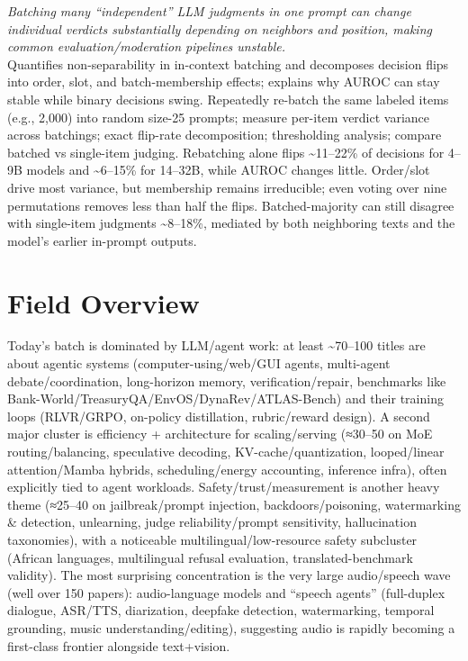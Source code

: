 \documentclass[12pt,letterpaper]{article}
\begin{document}
{\small\textit{Batching many ``independent'' LLM judgments in one prompt can change individual verdicts substantially depending on neighbors and position, making common evaluation/moderation pipelines unstable.}}\\[1pt]
{\footnotesize Quantifies non-separability in in-context batching and decomposes decision flips into order, slot, and batch-membership effects; explains why AUROC can stay stable while binary decisions swing. Repeatedly re-batch the same labeled items (e.g., 2,000) into random size-25 prompts; measure per-item verdict variance across batchings; exact flip-rate decomposition; thresholding analysis; compare batched vs single-item judging. Rebatching alone flips \textasciitilde{}11--22\% of decisions for 4--9B models and \textasciitilde{}6--15\% for 14--32B, while AUROC changes little. Order/slot drive most variance, but membership remains irreducible; even voting over nine permutations removes less than half the flips. Batched-majority can still disagree with single-item judgments \textasciitilde{}8--18\%, mediated by both neighboring texts and the model's earlier in-prompt outputs.}

\medskip



\section*{Field Overview}
{\footnotesize Today's batch is dominated by LLM/agent work: at least \textasciitilde{}70--100 titles are about agentic systems (computer-using/web/GUI agents, multi-agent debate/coordination, long-horizon memory, verification/repair, benchmarks like Bank-World/TreasuryQA/EnvOS/DynaRev/ATLAS-Bench) and their training loops (RLVR/GRPO, on-policy distillation, rubric/reward design). A second major cluster is efficiency + architecture for scaling/serving (≈30--50 on MoE routing/balancing, speculative decoding, KV-cache/quantization, looped/linear attention/Mamba hybrids, scheduling/energy accounting, inference infra), often explicitly tied to agent workloads. Safety/trust/measurement is another heavy theme (≈25--40 on jailbreak/prompt injection, backdoors/poisoning, watermarking \& detection, unlearning, judge reliability/prompt sensitivity, hallucination taxonomies), with a noticeable multilingual/low-resource safety subcluster (African languages, multilingual refusal evaluation, translated-benchmark validity). The most surprising concentration is the very large audio/speech wave (well over 150 papers): audio-language models and ``speech agents'' (full-duplex dialogue, ASR/TTS, diarization, deepfake detection, watermarking, temporal grounding, music understanding/editing), suggesting audio is rapidly becoming a first-class frontier alongside text+vision.}
\end{document}
